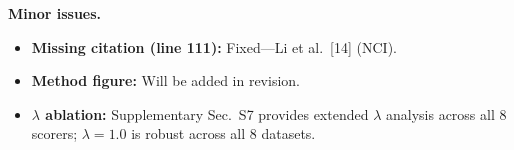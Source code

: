 \documentclass[runningheads]{llncs}
\begin{document}
\medskip
\noindent\textbf{Minor issues.}
\begin{itemize}\setlength\itemsep{0pt}
\item \textbf{Missing citation (line 111):} Fixed---Li et al.\ [14] (NCI).
\item \textbf{Method figure:} Will be added in revision.
\item \textbf{$\lambda$ ablation:} Supplementary Sec.~S7 provides extended $\lambda$ analysis across all 8 scorers; $\lambda{=}1.0$ is robust across all 8 datasets.
\end{itemize}
\end{document}
